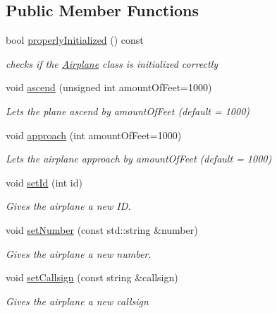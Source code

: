 \subsection*{Public Member Functions}
\begin{DoxyCompactItemize}
\item 
bool \mbox{\hyperlink{class_airplane_a6f80df8f692cc8d67d292c1e9f26d59e}{properly\+Initialized}} () const
\begin{DoxyCompactList}\small\item\em checks if the \mbox{\hyperlink{class_airplane}{Airplane}} class is initialized correctly \end{DoxyCompactList}\item 
void \mbox{\hyperlink{class_airplane_af9bad7ac84b24f462f564a4c8f21bfe0}{ascend}} (unsigned int amount\+Of\+Feet=1000)
\begin{DoxyCompactList}\small\item\em Lets the plane ascend by amount\+Of\+Feet (default = 1000) \end{DoxyCompactList}\item 
void \mbox{\hyperlink{class_airplane_ac8741288ed67b0a8d966e5a7442e9302}{approach}} (int amount\+Of\+Feet=1000)
\begin{DoxyCompactList}\small\item\em Lets the airplane approach by amount\+Of\+Feet (default = 1000) \end{DoxyCompactList}\item 
void \mbox{\hyperlink{class_airplane_ac71484f422e952d4cfe94d89b302dbc4}{set\+Id}} (int id)
\begin{DoxyCompactList}\small\item\em Gives the airplane a new ID. \end{DoxyCompactList}\item 
void \mbox{\hyperlink{class_airplane_af9bf0ea879bf7875b71f552ac9400da7}{set\+Number}} (const std\+::string \&number)
\begin{DoxyCompactList}\small\item\em Gives the airplane a new number. \end{DoxyCompactList}\item 
void \mbox{\hyperlink{class_airplane_aed67dce16e3a4b1c1811e3344a039d90}{set\+Callsign}} (const string \&callsign)
\begin{DoxyCompactList}\small\item\em Gives the airplane a new callsign ~\newline
 ~\newline

\end{DoxyCompactList}
\end{DoxyCompactItemize}
